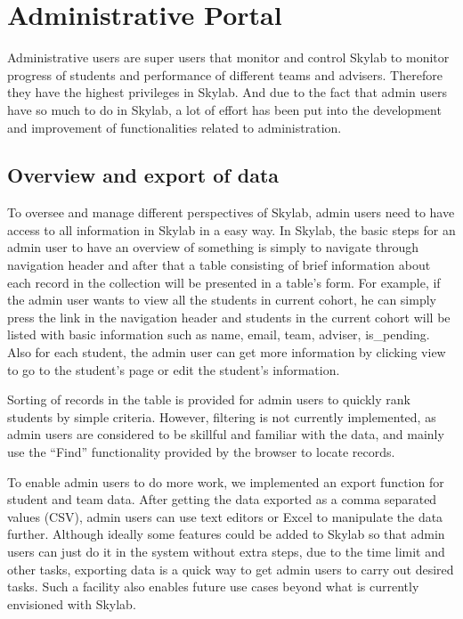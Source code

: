 \chapter{Administrative Portal} \label{adminportal}

Administrative users are super users that monitor and control Skylab to monitor progress of students and performance of different teams and advisers. Therefore they have the highest privileges in Skylab. And due to the fact that admin users have so much to do in Skylab, a lot of effort has been put into the development and improvement of functionalities related to administration.

\section{Overview and export of data} \label{adminoverview}

To oversee and manage different perspectives of Skylab, admin users need to have access to all information in Skylab in a easy way. In Skylab, the basic steps for an admin user to have an overview of something is simply to navigate through navigation header and after that a table consisting of brief information about each record in the collection will be presented in a table's form. For example, if the admin user wants to view all the students in current cohort, he can simply press the link in the navigation header and students in the current cohort will be listed with basic information such as name, email, team, adviser, is\_pending. Also for each student, the admin user can get more information by clicking view to go to the student's page or edit the student's information.

Sorting of records in the table is provided for admin users to quickly rank students by simple criteria. However, filtering is not currently implemented, as admin users are considered to be skillful and familiar with the data, and mainly use the ``Find'' functionality provided by the browser to locate records.

To enable admin users to do more work, we implemented an export function for student and team data. After getting the data exported as a comma separated values (CSV), admin users can use text editors or Excel to manipulate the data further. Although ideally some features could be added to Skylab so that admin users can just do it in the system without extra steps, due to the time limit and other tasks, exporting data is a quick way to get admin users to carry out desired tasks.  Such a facility also enables future use cases beyond what is currently envisioned with Skylab.

